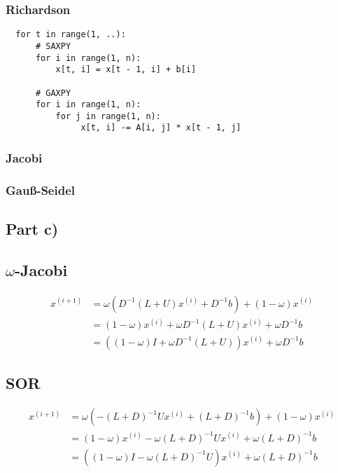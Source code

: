 \documentclass[10pt,a4paper]{article}
\begin{document}
\subsubsection*{Richardson}

\begin{verbatim}
  for t in range(1, ..):
      # SAXPY
      for i in range(1, n):
          x[t, i] = x[t - 1, i] + b[i]

      # GAXPY
      for i in range(1, n):
          for j in range(1, n):
               x[t, i] -= A[i, j] * x[t - 1, j]
\end{verbatim}

\subsubsection*{Jacobi}

\subsubsection*{Gauß-Seidel}

\subsection*{Part c)}

\subsection*{$\omega$-Jacobi}

\begin{align*}
  x^{(i + 1)} & = \omega(D^{-1}(L + U)x^{(i)} + D^{-1}b) + (1 - \omega)x^{(i)}\\
              & = (1 - \omega)x^{(i)} + \omega D^{-1}(L + U)x^{(i)} + \omega D^{-1}b\\
              & = ((1 - \omega)I + \omega D^{-1}(L + U))x^{(i)} + \omega D^{-1}b
\end{align*}

\subsection*{SOR}

\begin{align*}
  x^{(i + 1)} & = \omega(-(L + D)^{-1}Ux^{(i)} + (L + D)^{-1}b) + (1 - \omega)x^{(i)}\\
              & = (1 - \omega)x^{(i)} - \omega(L + D)^{-1}Ux^{(i)} + \omega(L + D)^{-1}b\\
              & = ((1 - \omega)I - \omega(L + D)^{-1}U)x^{(i)} + \omega(L + D)^{-1}b
\end{align*}
\end{document}
